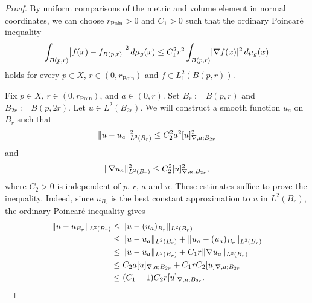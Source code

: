 \documentclass[a4paper,oneside,12pt]{amsart}
\theoremstyle{plain}
\theoremstyle{definition}
\theoremstyle{remark}
\DeclarePairedDelimiter{\abs}{\lvert}{\rvert}
\DeclarePairedDelimiter{\norm}{\lVert}{\rVert}
\DeclarePairedDelimiter{\seminorm}{\lbrack}{\rbrack}
\newcommand{\dvol}{d\mu}
\newcommand{\Ltwonorm}[2][L^2]{\norm{#2}_{#1}}
\newcommand{\mesoscopicdifferenceseminormLocal}[3][a]{\seminorm{#3}_{\nabla,#1;#2}}
\newcommand{\radiusPoincare}{r_{\mathrm{Poin}}}
\begin{document}
\begin{proof}
  By uniform comparisons of the metric and volume element in normal coordinates, we can choose $\radiusPoincare > 0$ and $C_1 > 0$ such that the ordinary Poincar\'e inequality
  \begin{equation}
    \int_{B(p,r)} \abs*{f(x) - f_{B(p,r)}}^2 \,\dvol_g(x) \le C_1^2 r^2 \int_{B(p,r)} \abs{\nabla f(x)}^2 \,\dvol_g(x)
  \end{equation}
  holds for every $p \in X$, $r \in (0,\radiusPoincare)$ and $f \in L^2_1(B(p,r))$.

  Fix $p \in X$, $r \in (0,\radiusPoincare)$, and $a \in (0,r)$.
  Set $B_r := B(p,r)$ and $B_{2r} := B(p,2r)$.
  Let $u \in L^2(B_{2r})$.
  We will construct a smooth function $u_a$ on $B_r$ such that
  \begin{equation}\label{inequality: shell mollification error}
    \Ltwonorm[L^2(B_r)]{u-u_a}^2 \le C_2^2 a^2 \mesoscopicdifferenceseminormLocal{B_{2r}}{u}^2
  \end{equation}
  and
  \begin{equation}\label{inequality: shell gradient estimate}
    \Ltwonorm[L^2(B_r)]{\nabla u_a}^2 \le C_2^2 \mesoscopicdifferenceseminormLocal{B_{2r}}{u}^2,
  \end{equation}
  where $C_2 > 0$ is independent of $p$, $r$, $a$ and $u$.
  These estimates suffice to prove the inequality.
  Indeed, since $u_{B_r}$ is the best constant approximation to $u$ in $L^2(B_r)$, the ordinary Poincar\'e inequality gives
  \begin{equation}
    \begin{aligned}
      \Ltwonorm[L^2(B_r)]{u-u_{B_r}} \le{}& \Ltwonorm[L^2(B_r)]{u-(u_a)_{B_r}}\\
      \le{}& \Ltwonorm[L^2(B_r)]{u-u_a} + \Ltwonorm[L^2(B_r)]{u_a - (u_a)_{B_r}} \\
      \le{}& \Ltwonorm[L^2(B_r)]{u-u_a} + C_1 r \Ltwonorm[L^2(B_r)]{\nabla u_a} \\
      \le{}& C_2 a \mesoscopicdifferenceseminormLocal{B_{2r}}{u} + C_1 r C_2 \mesoscopicdifferenceseminormLocal{B_{2r}}{u} \\
      \le{}& (C_1+1)C_2 r \mesoscopicdifferenceseminormLocal{B_{2r}}{u}.
    \end{aligned}
  \end{equation}


\end{proof}
\end{document}
